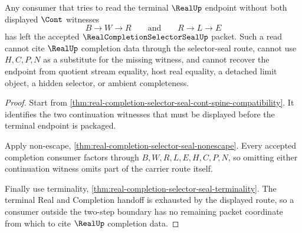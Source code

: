\begin{theorem}
\label{thm:real-completion-selector-seal-two-step-cont-boundary}
Any consumer that tries to read the terminal $\RealUp$ endpoint without both displayed $\Cont$ witnesses
$$
B \to W \to R
\qquad\text{and}\qquad
R \to L \to E
$$
has left the accepted $\RealCompletionSelectorSealUp$ packet. Such a read cannot cite $\RealUp$ completion data through the selector-seal route, cannot use $H,C,P,N$ as a substitute for the missing witness, and cannot recover the endpoint from quotient stream equality, host real equality, a detached limit object, a hidden selector, or ambient completeness.
\end{theorem}
\begin{proof}
Start from \autoref{thm:real-completion-selector-seal-cont-spine-compatibility}. It identifies the two continuation witnesses that must be displayed before the terminal endpoint is packaged.

Apply non-escape, \autoref{thm:real-completion-selector-seal-nonescape}. Every accepted completion consumer factors through $B,W,R,L,E,H,C,P,N$, so omitting either continuation witness omits part of the carrier route itself.

Finally use terminality, \autoref{thm:real-completion-selector-seal-terminality}. The terminal Real and Completion handoff is exhausted by the displayed route, so a consumer outside the two-step boundary has no remaining packet coordinate from which to cite $\RealUp$ completion data.
\end{proof}

